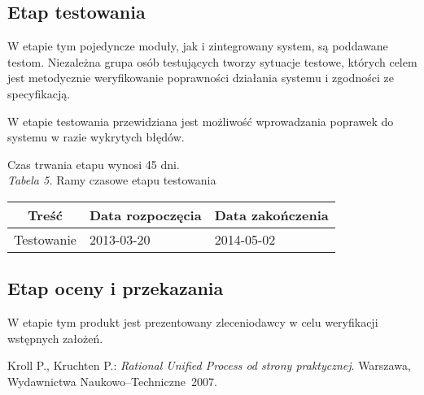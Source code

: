 \documentclass 	[11pt, a4paper, leqno]	{article}					%
\begin{document}
\subsection{Etap testowania}
\noindent
W etapie tym pojedyncze moduły, jak i zintegrowany system, są poddawane testom. Niezależna grupa osób testujących tworzy sytuacje testowe, których celem jest metodycznie weryfikowanie poprawności działania systemu i zgodności ze specyfikacją.

W etapie testowania przewidziana jest możliwość wprowadzania poprawek do systemu w razie wykrytych błędów. 

Czas trwania etapu wynosi 45 dni. \\

\textit{Tabela 5.} Ramy czasowe etapu testowania

\begin{center}
	\begin{tabular}{| l | l | l |}
		\hline
		\multicolumn{1}{|c|}{Treść} & 
		\multicolumn{1}{|c|}{Data rozpoczęcia} & 
		\multicolumn{1}{|c|}{Data zakończenia} \\ \hline \hline
		Testowanie & 2013-03-20 & 2014-05-02 \\ \hline
	\end{tabular}
\end{center}

\subsection{Etap oceny i przekazania}
\noindent
W etapie tym produkt jest prezentowany zleceniodawcy w celu weryfikacji wstępnych założeń. 

\newpage

\begin{thebibliography}{2}
	 Kroll P., Kruchten P.: \emph{Rational Unified Process od strony praktycznej}. Warszawa, Wydawnictwa Naukowo--Techniczne~2007.
\end{thebibliography}
\end{document}
